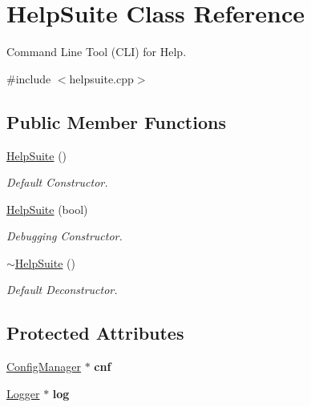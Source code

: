 \hypertarget{classHelpSuite}{}\section{Help\+Suite Class Reference}
\label{classHelpSuite}


Command Line Tool (C\+LI) for Help.  




{\ttfamily \#include $<$helpsuite.\+cpp$>$}

\subsection*{Public Member Functions}
\begin{DoxyCompactItemize}
\item 
\mbox{\label{classHelpSuite_ad859c688219b1c5a9be784824ebf6ee3}} 
\mbox{\hyperlink{classHelpSuite_ad859c688219b1c5a9be784824ebf6ee3}{Help\+Suite}} ()
\begin{DoxyCompactList}\small\item\em Default Constructor. \end{DoxyCompactList}\item 
\mbox{\hyperlink{classHelpSuite_a63ce00b20708ab06e62f8cb0061ad47e}{Help\+Suite}} (bool)
\begin{DoxyCompactList}\small\item\em Debugging Constructor. \end{DoxyCompactList}\item 
\mbox{\label{classHelpSuite_a1b9b75d382cd4eb9e5e46e51bb6064e7}} 
\mbox{\hyperlink{classHelpSuite_a1b9b75d382cd4eb9e5e46e51bb6064e7}{$\sim$\+Help\+Suite}} ()
\begin{DoxyCompactList}\small\item\em Default Deconstructor. \end{DoxyCompactList}\end{DoxyCompactItemize}
\subsection*{Protected Attributes}
\begin{DoxyCompactItemize}
\item 
\mbox{\label{classHelpSuite_a2689c216454718b929274b205817cb16}} 
\mbox{\hyperlink{classConfigManager}{Config\+Manager}} $\ast$ {\bfseries cnf}
\item 
\mbox{\label{classHelpSuite_a7e5fc902215df750b0d638492c692d2c}} 
\mbox{\hyperlink{classLogger}{Logger}} $\ast$ {\bfseries log}
\end{DoxyCompactItemize}


